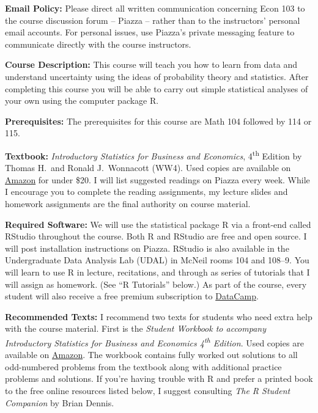 \documentclass[11pt, letterpaper]{article}
\begin{document}
\noindent \textbf{Email Policy:}
Please direct all written communication concerning Econ 103 to the course discussion forum -- Piazza -- rather than to the instructors' personal email accounts.
For personal issues, use Piazza's private messaging feature to communicate directly with the course instructors. 

\medskip



\noindent \textbf{Course Description:} 
This course will teach you how to learn from data and understand uncertainty using the ideas of probability theory and statistics. 
After completing this course you will be able to carry out simple statistical analyses of your own using the computer package R.


\medskip


\noindent \textbf{Prerequisites:} 
The prerequisites for this course are Math 104 followed by 114 or 115. 



\medskip

\noindent \textbf{Textbook:} 
\emph{Introductory Statistics for Business and Economics}, 4\textsuperscript{th} Edition by Thomas H.\ and Ronald J.\ Wonnacott (WW4). 
Used copies are available on \href{http://tinyurl.com/ECON103-2013A}{Amazon} for under \$20.
I will list suggested readings on Piazza every week. 
While I encourage you to complete the reading assignments, my lecture slides and homework assignments are the final authority on course material.

\medskip


\noindent \textbf{Required Software:} 
We will use the statistical package R via a front-end called RStudio throughout the course. 
Both R and RStudio are free and open source. 
I will post installation instructions on Piazza.
RStudio is also available in the Undergraduate Data Analysis Lab (UDAL) in McNeil rooms 104 and 108--9. 
You will learn to use R in lecture, recitations, and through as series of tutorials that I will assign as homework. (See ``R Tutorials'' below.)  
As part of the course, every student will also receive a free premium subscription to \href{https://datacamp.com}{DataCamp}.

\medskip

\noindent \textbf{Recommended Texts:} 
I recommend two texts for students who need extra help with the course material. 
First is the \emph{Student Workbook to accompany Introductory Statistics for Business and Economics 4\textsuperscript{th} Edition}. 
Used copies are available on \href{http://www.amazon.com/gp/offer-listing/0471508993/sr=/qid=/ref=olp_page_2?ie=UTF8&colid=&coliid=&condition=all&me=&qid=&shipPromoFilter=0&sort=sip&sr=&startIndex=10}{Amazon}. 
The workbook contains fully worked out solutions to all odd-numbered problems from the textbook along with additional practice problems and solutions.
If you're having trouble with R and prefer a printed book to the free online resources listed below, I suggest consulting \emph{The R Student Companion} by Brian Dennis.
\end{document}
